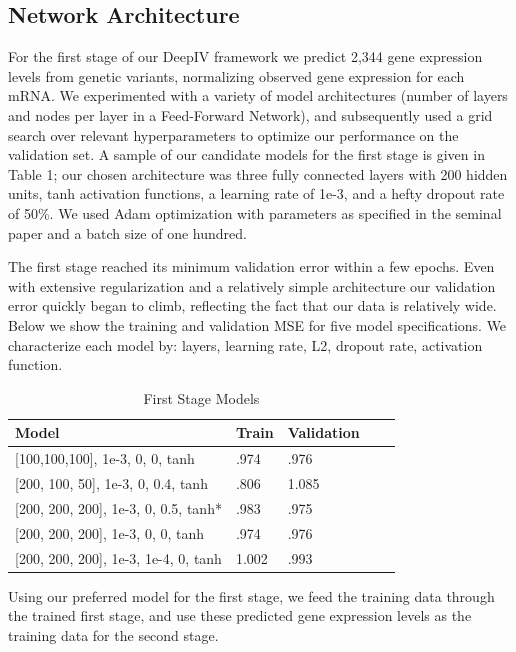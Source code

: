 \documentclass[10.5pt, oneside, twocolumn]{article}   	%
\begin{document}
\subsection{Network Architecture}
For the first stage of our DeepIV framework we predict 2,344 gene expression levels from genetic variants, normalizing observed gene expression for each mRNA. We experimented with a variety of model architectures (number of layers and nodes per layer in a Feed-Forward Network), and subsequently used a grid search over relevant hyperparameters to optimize our performance on the validation set. A sample of our candidate models for the first stage is given in Table 1; our chosen architecture was three fully connected layers with 200 hidden units, tanh activation functions, a learning rate of 1e-3, and a hefty dropout rate of 50\%. We used Adam optimization with parameters as specified in the seminal paper\cite{kingma2014adam} and a batch size of one hundred.

The first stage reached its minimum validation error within a few epochs. Even with extensive regularization and a relatively simple architecture our validation error quickly began to climb, reflecting the fact that our data is relatively wide. Below we show the training and validation MSE for five model specifications. We characterize each model by: layers, learning rate, L2, dropout rate, activation function. 

\begin{table}[h]
\centering
\caption{First Stage Models}
\label{my-label}
\begin{tabular}{@{}lllll@{}}
\toprule
Model & Train & Validation &  \\ \midrule
{[}100,100,100{]}, 1e-3, 0, 0, tanh         & .974           & .976    \\
{[}200, 100, 50{]}, 1e-3, 0, 0.4, tanh      & .806           & 1.085   \\
{[}200, 200, 200{]}, 1e-3, 0, 0.5, tanh*    & .983           & .975  \\
{[}200, 200, 200{]}, 1e-3, 0, 0, tanh       & .974           & .976     \\
{[}200, 200, 200{]}, 1e-3, 1e-4, 0, tanh    & 1.002          & .993     
\end{tabular}
\end{table}

Using our preferred model for the first stage, we feed the training data through the trained first stage, and use these predicted gene expression levels as the training data for the second stage. 
\end{document}
